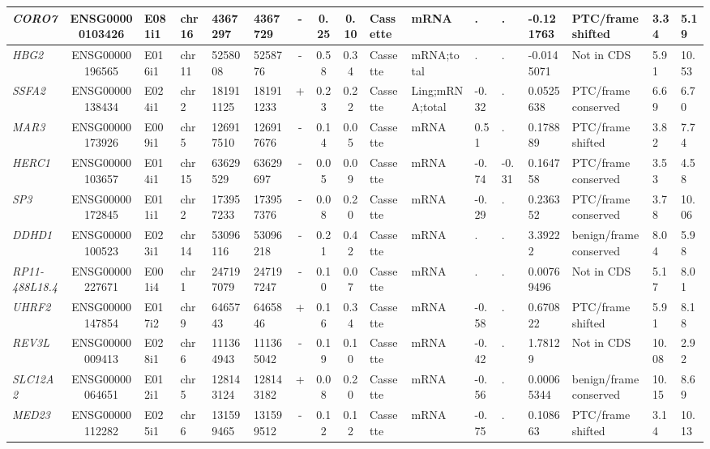 \begin{landscape}
\begin{table}
{\begin{tabular}{|l|c|l|l|l|l|c|c|c|l|l|l|l|l|l|l|l|}
		\textit{CORO7} & ENSG00000103426 & E081i1 & chr16 & 4367297 & 4367729 & -     & 0.25  & 0.10  & Cassette & mRNA  & . & . & -0.121763 & PTC/frame shifted & 3.34  &  5.19 \\ \hline
		\textit{HBG2} & ENSG00000196565 & E016i1 & chr11 & 5258008 & 5258776 & -     & 0.58  & 0.34  & Cassette & mRNA;total & . & . & -0.0145071 & Not in CDS     & 5.91  &  10.53 \\ \hline
		\textit{SSFA2} & ENSG00000138434 & E024i1 & chr2  & 181911125 & 181911233 & +     & 0.23  & 0.22  & Cassette & Ling;mRNA;total & -0.32 & . & 0.0525638 & PTC/frame conserved & 6.69  &  6.70 \\ \hline
		\textit{MAR3} & ENSG00000173926 & E009i1 & chr5  & 126917510 & 126917676 & -     & 0.14  & 0.05  & Cassette & mRNA  & 0.51  & . & 0.178889 & PTC/frame shifted & 3.82  &  7.74 \\ \hline
		\textit{HERC1} & ENSG00000103657 & E014i1 & chr15 & 63629529 & 63629697 & -     & 0.05  & 0.09  & Cassette & mRNA  & -0.74 & -0.31 & 0.164758 & PTC/frame conserved & 3.53  &  4.58 \\ \hline
		\textit{SP3} & ENSG00000172845 & E011i1 & chr2  & 173957233 & 173957376 & -     & 0.08  & 0.20  & Cassette & mRNA  & -0.29 & . & 0.236352 & PTC/frame conserved & 3.78  &  10.06 \\ \hline
		\textit{DDHD1} & ENSG00000100523 & E023i1 & chr14 & 53096116 & 53096218 & -     & 0.21  & 0.42  & Cassette & mRNA  & . & . & 3.39222 & benign/frame conserved & 8.04  &  5.98 \\ \hline
		\textit{RP11-488L18.4} & ENSG00000227671 & E001i4 & chr1  & 247197079 & 247197247 & -     & 0.10  & 0.07  & Cassette & mRNA  & . & . & 0.00769496 & Not in CDS     & 5.17  &  8.01 \\ \hline
		\textit{UHRF2} & ENSG00000147854 & E017i2 & chr9  & 6465743 & 6465846 & +     & 0.16  & 0.34  & Cassette & mRNA  & -0.58 & . & 0.670822 & PTC/frame shifted & 5.91  &  8.18 \\ \hline
		\textit{REV3L} & ENSG00000009413 & E028i1 & chr6  & 111364943 & 111365042 & -     & 0.19  & 0.10  & Cassette & mRNA  & -0.42 & . & 1.78129 & Not in CDS    & 10.08 &  2.92 \\ \hline
		\textit{SLC12A2} & ENSG00000064651 & E012i1 & chr5  & 128143124 & 128143182 & +     & 0.08  & 0.20  & Cassette & mRNA  & -0.56 & . & 0.00065344 & benign/frame conserved & 10.15 &  8.69 \\ \hline
		\textit{MED23} & ENSG00000112282 & E025i1 & chr6  & 131599465 & 131599512 & -     & 0.12  & 0.12  & Cassette & mRNA  & -0.75 & . & 0.108663 & PTC/frame shifted & 3.14  &  10.13 \\ \hline

\end{tabular}}
\end{table}
\end{landscape}
